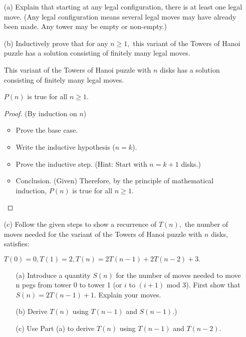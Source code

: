 \documentclass[12pt]{article}
\newcommand{\vs}{\vspace{2mm}}
\newcommand{\ls}{\vspace{5mm}}
\begin{document}
\begin{itemize}
 \item[(a)] Explain that starting at any legal configuration, there is at least one legal move. (Any legal configuration means several legal moves may have already been made. Any tower may be empty or non-empty.)

 \item[(b)]  Inductively prove that for any $n \geq 1,$ this variant of the Towers of Hanoi puzzle has a solution consisting of finitely many legal moves.
\vs\

 This variant of the Towers of Hanoi puzzle with $n$ disks has a solution consisting of finitely many legal moves. 
\ls\

 $P(n)$ is true for all $n \geq 1$.
\vs\

\begin{proof} (By induction on $n$)

    \begin{itemize}
    \item Prove the base case.
    \item Write the inductive hypothesis ($n=k$).
    \item Prove the inductive step. (Hint: Start with $n= k+1$ disks.)
    \item Conclusion. (Given)
    Therefore, by the principle of mathematical induction, $P(n)$ is true for all $n \geq 1.$
    \end{itemize}
    
\end{proof}

 \item[(c)] Follow the given steps to show a recurrence of $T(n),$ the  number of moves needed for the variant of the Towers of Hanoi puzzle with $n$ disks, satisfies:

$T(0)= 0, T(1)=2, T(n) = 2T(n-1)+ 2T(n-2)+3.$ 

\begin{itemize}
    \item[(a)]Introduce a quantity $S(n)$ for the number of moves needed to move n pegs from tower 0 to tower 1 (or $i$ to $(i+1)$ mod 3). 
First show that
 $ S(n) = 2 T(n-1) + 1$.  Explain your moves.
 
 \item[(b)] Derive $T(n)$ using $T(n-1)$ and $S(n-1)$.)

\item[(c)] Use Part (a) to derive $T(n)$ using $T(n-1)$ and $T(n-2)$.
\end{itemize}

\end{itemize}
\end{document}
